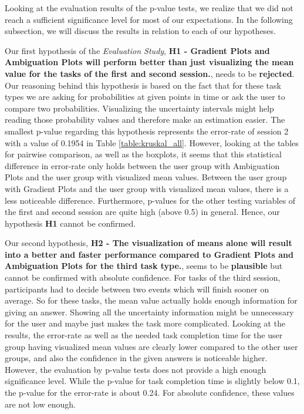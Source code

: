 Looking at the evaluation results of the p-value tests, we realize that we did not reach a sufficient significance level for most of our expectations. In the following subsection, we will discuss the results in relation to each of our hypotheses. \par \medskip

Our first hypothesis of the \textit{Evaluation Study}, \textbf{H1 - Gradient Plots and Ambiguation Plots will perform better than just visualizing the mean value for the tasks of the first and second session.}, needs to be \textbf{rejected}. Our reasoning behind this hypothesis is based on the fact that for these task types we are asking for probabilities at given points in time or ask the user to compare two probabilities. Visualizing the uncertainty intervals might help reading those probability values and therefore make an estimation easier. The smallest p-value regarding this hypothesis represents the error-rate of session 2 with a value of 0.1954 in Table \ref{table:kruskal_all}. However, looking at the tables for pairwise comparison, as well as the boxplots, it seems that this statistical difference in error-rate only holds between the user group with Ambiguation Plots and the user group with visualized mean values. Between the user group with Gradient Plots and the user group with visualized mean values, there is a less noticeable difference. Furthermore, p-values for the other testing variables of the first and second session are quite high (above 0.5) in general. Hence, our hypothesis \textbf{H1} cannot be confirmed. \par \medskip

Our second hypothesis, \textbf{H2 - The visualization of means alone will result into a better and faster performance compared to Gradient Plots and Ambiguation Plots for the third task type.}, seems to be \textbf{plausible} but cannot be confirmed with absolute confidence. For tasks of the third session, participants had to decide between two events which will finish sooner on average. So for these tasks, the mean value actually holds enough information for giving an answer. Showing all the uncertainty information might be unnecessary for the user and maybe just makes the task more complicated. Looking at the results, the error-rate as well as the needed task completion time for the user group having visualized mean values are clearly lower compared to the other user groups, and also the confidence in the given answers is noticeable higher. However, the evaluation by p-value tests does not provide a high enough significance level. While the p-value for task completion time is slightly below 0.1, the p-value for the error-rate is about 0.24. For absolute confidence, these values are not low enough. \par \medskip

